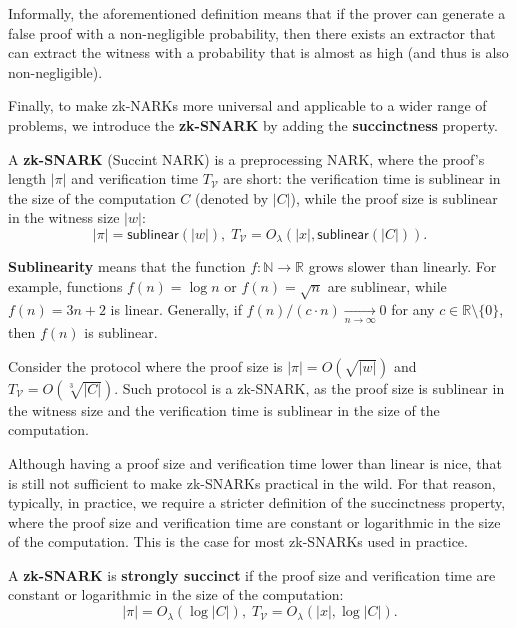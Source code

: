 \documentclass[../lecture-notes.tex]{subfiles}
\begin{document}
\begin{remark}
    Informally, the aforementioned definition means that if the prover can generate a false proof with a non-negligible probability, then there exists an extractor that can extract the witness with a probability that is almost as high (and thus is also non-negligible).
\end{remark}

Finally, to make zk-NARKs more universal and applicable to a wider range of problems, we introduce the \textbf{zk-SNARK} by adding the \textbf{succinctness} property.

\begin{definition}
    A \textbf{zk-SNARK} (Succint NARK) is a preprocessing NARK, where the proof's length $|\pi|$ and verification time $T_{\mathcal{V}}$ are short: the verification time is sublinear in the size of the computation $C$ (denoted by $|C|$), while the proof size is sublinear in the witness size $|w|$:
    \begin{equation*}
        |\pi| = \mathsf{sublinear}(|w|), \; T_{\mathcal{V}} = O_{\lambda}(|x|, \mathsf{sublinear}(|C|)).
    \end{equation*}
\end{definition}

\begin{remark}
    \textbf{Sublinearity} means that the function $f: \mathbb{N} \to \mathbb{R}$ grows slower than linearly. For example, functions $f(n) = \log n$ or $f(n) = \sqrt{n}$ are sublinear, while $f(n) = 3n+2$ is linear. Generally, if $f(n)/(c\cdot n) \xrightarrow[n \to \infty]{} 0$ for any $c \in \mathbb{R}\setminus \{0\}$, then $f(n)$ is sublinear.
\end{remark}

\begin{example}
    Consider the protocol where the proof size is $|\pi| = O(\sqrt{|w|})$ and $T_{\mathcal{V}} = O(\sqrt[3]{|C|})$. Such protocol is a zk-SNARK, as the proof size is sublinear in the witness size and the verification time is sublinear in the size of the computation.
\end{example}

Although having a proof size and verification time lower than linear is nice, that is still not sufficient to make zk-SNARKs practical in the wild. For that reason, typically, in practice, we require a stricter definition of the succinctness property, where the proof size and verification time are constant or logarithmic in the size of the computation. This is the case for most zk-SNARKs used in practice.
\begin{definition}
    A \textbf{zk-SNARK} is \textbf{strongly succinct} if the proof size and verification time are constant or logarithmic in the size of the computation:
    \begin{equation*}
        |\pi| = O_{\lambda}(\log |C|), \; T_{\mathcal{V}} = O_{\lambda}(|x|, \log|C|).
    \end{equation*}
\end{definition}
\end{document}
